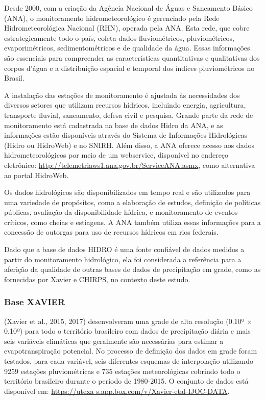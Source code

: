 \documentclass[
]{agujournal2019}
\begin{document}
Desde 2000, com a criação da Agência Nacional de Águas e Saneamento
Básico (ANA), o monitoramento hidrometeorológico é gerenciado pela Rede
Hidrometeorológica Nacional (RHN), operada pela ANA. Esta rede, que
cobre estrategicamente todo o país, coleta dados fluviométricos,
pluviométricos, evaporimétricos, sedimentométricos e de qualidade da
água. Essas informações são essenciais para compreender as
características quantitativas e qualitativas dos corpos d'água e a
distribuição espacial e temporal dos índices pluviométricos no Brasil.

A instalação das estações de monitoramento é ajustada às necessidades
dos diversos setores que utilizam recursos hídricos, incluindo energia,
agricultura, transporte fluvial, saneamento, defesa civil e pesquisa.
Grande parte da rede de monitoramento está cadastrada na base de dados
Hidro da ANA, e as informações estão disponíveis através do Sistema de
Informações Hidrológicas (Hidro ou HidroWeb) e no SNIRH. Além disso, a
ANA oferece acesso aos dados hidrometeorológicos por meio de um
webservice, disponível no endereço eletrônico:
\url{http://telemetriaws1.ana.gov.br/ServiceANA.asmx}, como alternativa
ao portal HidroWeb.

Os dados hidrológicos são disponibilizados em tempo real e são
utilizados para uma variedade de propósitos, como a elaboração de
estudos, definição de políticas públicas, avaliação da disponibilidade
hídrica, e monitoramento de eventos críticos, como cheias e estiagens. A
ANA também utiliza essas informações para a concessão de outorgas para
uso de recursos hídricos em rios federais.

Dado que a base de dados HIDRO é uma fonte confiável de dados medidos a
partir do monitoramento hidrológico, ela foi considerada a referência
para a aferição da qualidade de outras bases de dados de precipitação em
grade, como as fornecidas por Xavier e CHIRPS, no contexto deste estudo.

\subsubsection{Base XAVIER}\label{base-xavier}

(Xavier et al., 2015, 2017) desenvolveram uma grade de alta resolução
(0.10º × 0.10º) para todo o território brasileiro com dados de
precipitação diária e mais seis variáveis climáticas que geralmente são
necessárias para estimar a evapotranspiração potencial. No processo de
definição dos dados em grade foram testados, para cada variável, seis
diferentes esquemas de interpolação utilizando 9259 estações
pluviométricas e 735 estações meteorológicas cobrindo todo o território
brasileiro durante o período de 1980-2015. O conjunto de dados está
disponível em:
\href{https://utexa\%20s.app.box.com/v/Xavier-etal-IJOC-DATA}{https://utexa
s.app.box.com/v/Xavier-etal-IJOC-DATA}.
\end{document}
